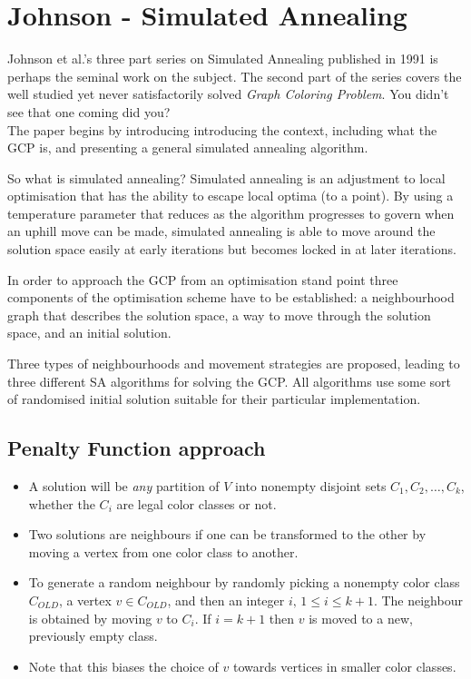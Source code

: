 \section{Johnson - Simulated Annealing}

Johnson et al.'s three part series on Simulated Annealing published in 1991 is perhaps the seminal work on the subject. The second part of the series covers the well studied yet never satisfactorily solved \emph{Graph Coloring Problem}. You didn't see that one coming did you?\\

The paper begins by introducing introducing the context, including what the GCP is, and presenting a general simulated annealing algorithm.

So what is simulated annealing? Simulated annealing is an adjustment to local optimisation that has the ability to escape local optima (to a point). By using a temperature parameter that reduces as the algorithm progresses to govern when an uphill move can be made, simulated annealing is able to move around the solution space easily at early iterations but becomes locked in at later iterations.

In order to approach the GCP from an optimisation stand point three components of the optimisation scheme have to be established: a neighbourhood graph that describes the solution space, a way to move through the solution space, and an initial solution.

Three types of neighbourhoods and movement strategies are proposed, leading to three different SA algorithms for solving the GCP. All algorithms use some sort of randomised initial solution suitable for their particular implementation.

\subsection{Penalty Function approach}

\begin{itemize}
	\item A solution will be \emph{any} partition of $V$ into nonempty disjoint sets $C_1,C_2,\ldots,C_k$, whether the $C_i$ are legal color classes or not.
	\item Two solutions are neighbours if one can be transformed to the other by moving a vertex from one color class to another.
	\item To generate a random neighbour by randomly picking a nonempty color class $C_{OLD}$, a vertex $v \in C_{OLD}$, and then an integer $i,\,1 \leq i \leq k+1$. The neighbour is obtained by moving $v$ to $C_i$. If $i = k+1$ then $v$ is moved to a new, previously empty class.
	\item Note that this biases the choice of $v$ towards vertices in smaller color classes.
	\end{itemize}


